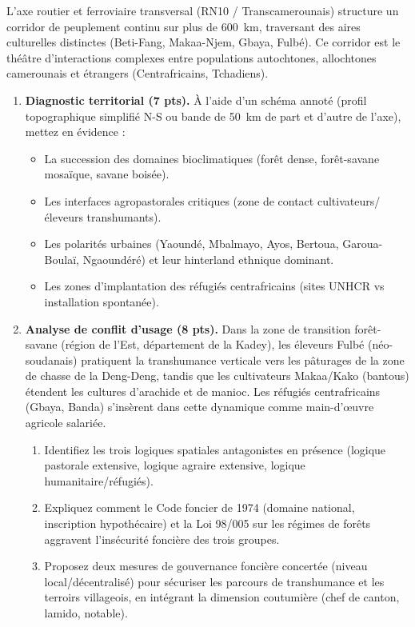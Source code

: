 \documentclass[11pt]{article}
\begin{document}
\begin{exercice}
L'axe routier et ferroviaire transversal (RN10 / Transcamerounais) structure un corridor de peuplement continu sur plus de \SI{600}{km}, traversant des aires culturelles distinctes (Beti-Fang, Makaa-Njem, Gbaya, Fulbé). Ce corridor est le théâtre d'interactions complexes entre populations autochtones, allochtones camerounais et étrangers (Centrafricains, Tchadiens).

\begin{enumerate}
    \item \textbf{Diagnostic territorial (7 pts).} À l'aide d'un schéma annoté (profil topographique simplifié N-S ou bande de \SI{50}{km} de part et d'autre de l'axe), mettez en évidence :
    \begin{itemize}
        \item La succession des domaines bioclimatiques (forêt dense, forêt-savane mosaïque, savane boisée).
        \item Les interfaces agropastorales critiques (zone de contact cultivateurs/éleveurs transhumants).
        \item Les polarités urbaines (Yaoundé, Mbalmayo, Ayos, Bertoua, Garoua-Boulaï, Ngaoundéré) et leur hinterland ethnique dominant.
        \item Les zones d'implantation des réfugiés centrafricains (sites UNHCR vs installation spontanée).
    \end{itemize}

    \item \textbf{Analyse de conflit d'usage (8 pts).} Dans la zone de transition forêt-savane (région de l'Est, département de la Kadey), les éleveurs Fulbé (néo-soudanais) pratiquent la transhumance verticale vers les pâturages de la zone de chasse de la Deng-Deng, tandis que les cultivateurs Makaa/Kako (bantous) étendent les cultures d'arachide et de manioc. Les réfugiés centrafricains (Gbaya, Banda) s'insèrent dans cette dynamique comme main-d'œuvre agricole salariée.
    \begin{enumerate}
        \item Identifiez les trois logiques spatiales antagonistes en présence (logique pastorale extensive, logique agraire extensive, logique humanitaire/réfugiés).
        \item Expliquez comment le Code foncier de 1974 (domaine national, inscription hypothécaire) et la Loi 98/005 sur les régimes de forêts aggravent l'insécurité foncière des trois groupes.
        \item Proposez deux mesures de gouvernance foncière concertée (niveau local/décentralisé) pour sécuriser les parcours de transhumance et les terroirs villageois, en intégrant la dimension coutumière (chef de canton, lamido, notable).
    \end{enumerate}


\end{enumerate}
\end{exercice}
\end{document}
